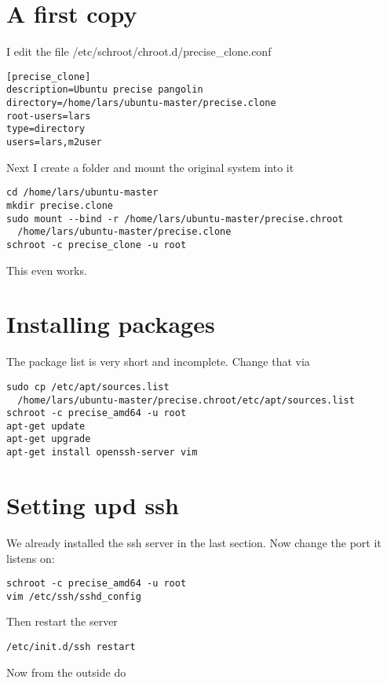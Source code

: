 \documentclass[a4paper]{article}
\begin{document}
\section{A first copy}
I edit the file /etc/schroot/chroot.d/precise\_clone.conf

\begin{verbatim}
[precise_clone]
description=Ubuntu precise pangolin
directory=/home/lars/ubuntu-master/precise.clone
root-users=lars
type=directory
users=lars,m2user
\end{verbatim}

Next I create a folder and mount the original system into it

\begin{verbatim}
cd /home/lars/ubuntu-master
mkdir precise.clone
sudo mount --bind -r /home/lars/ubuntu-master/precise.chroot 
  /home/lars/ubuntu-master/precise.clone
schroot -c precise_clone -u root
\end{verbatim}

This even works.

\section{Installing packages}
The package list is very short and incomplete. Change that via

\begin{verbatim}
sudo cp /etc/apt/sources.list 
  /home/lars/ubuntu-master/precise.chroot/etc/apt/sources.list
schroot -c precise_amd64 -u root
apt-get update
apt-get upgrade
apt-get install openssh-server vim
\end{verbatim}

\section{Setting upd ssh}

We already installed the ssh server in the last section. Now change the port it listens on:

\begin{verbatim}
schroot -c precise_amd64 -u root
vim /etc/ssh/sshd_config
\end{verbatim}

Then restart the server

\begin{verbatim}
/etc/init.d/ssh restart
\end{verbatim}

Now from the outside do
\end{document}
